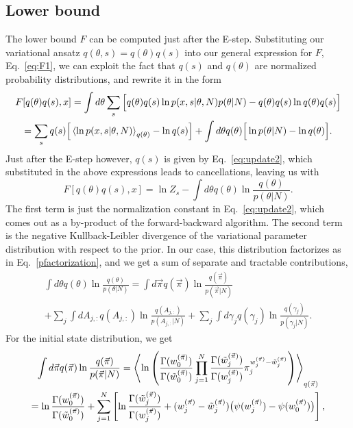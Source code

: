 \subsection{Lower bound}
The lower bound $F$ can be computed just after the
E-step. Substituting our variational ansatz
$q(\theta,s)=q(\theta)q(s)$ into our general expression for $F$,
Eq.~\eqref{eq:F1}, we can exploit the fact that $q(s)$ and $q(\theta)$
are normalized probability distributions, and rewrite it in the form
\begin{multline}
F[q(\theta)q(s),x]=\int d\theta\sum_s \Big[ q(\theta)q(s) \ln
    p(x,s|\theta,N)p(\theta|N) -q(\theta)q(s) \ln q(\theta)q(s) \Big]\\
=\sum_sq(s)\Big[\left\langle \ln p(x,s|\theta,N)\right\rangle_{q(\theta)} -\ln q(s)\Big]
+\int d\theta q(\theta)\Big[\ln p(\theta|N)-\ln q(\theta)\Big].
\end{multline}
Just after the E-step however, $q(s)$ is given by
Eq.~\eqref{eq:update2}, which substituted in the above expressions
leads to cancellations, leaving us with
\begin{equation}
F[q(\theta)q(s),x]=\ln Z_s-\int d\theta q(\theta)\ln\frac{q(\theta)}{p(\theta|N)}.
\end{equation}
The first term is just the normalization constant in
Eq.~\eqref{eq:update2}, which comes out as a by-product of the
forward-backward algorithm. The second term is the negative
Kullback-Leibler divergence of the variational parameter distribution
with respect to the prior. In our case, this distribution factorizes
as in Eq.~\eqref{pfactorization}, and we get a sum of separate and
tractable contributions,
\begin{multline}
\int d\theta q(\theta)\ln\frac{q(\theta)}{p(\theta|N)}
     =\int d\vec\pi q(\vec\pi)\ln\frac{q(\vec\pi)}{p(\vec\pi|N)}\\
     +\sum_j\int dA_{j,:} q(A_{j,:})\ln\frac{q(A_{j,:})}{p(A_{j,:}|N)}
     +\sum_j\int d\gamma_j q(\gamma_j)\ln\frac{q(\gamma_j)}{p(\gamma_j|N)}.
\end{multline}
For the initial state distribution, we get
\begin{multline}
  \int d\vec{\pi} q(\vec{\pi}) \ln\frac{q(\vec{\pi})}{p(\vec{\pi}|N)}
  =\left\langle \ln\left(\frac{\Gamma(w_0^{(\vec{\pi})})}{\Gamma(\tilde w_0^{(\vec{\pi})})}
    \prod_{j=1}^N\frac{\Gamma(\tilde w_j^{(\vec{\pi})})}{\Gamma(w_j^{(\vec{\pi})})}
    \pi_j^{w_j^{(\vec{\pi})}-\tilde w_j^{(\vec{\pi})}}\right)\right\rangle_{q(\vec{\pi})}\\
  =\ln\frac{\Gamma(w_0^{(\vec{\pi})})}{\Gamma(\tilde w_0^{(\vec{\pi})})}
  +\sum_{j=1}^N\left[\ln\frac{\Gamma(\tilde w_j^{(\vec{\pi})})}{\Gamma(w_j^{(\vec{\pi})})}
    +(w_j^{(\vec{\pi})}-\tilde w_j^{(\vec{\pi})})
    \big(\psi(w_j^{(\vec{\pi})})-\psi(w_0^{(\vec{\pi})})\big)\right],
\end{multline}
